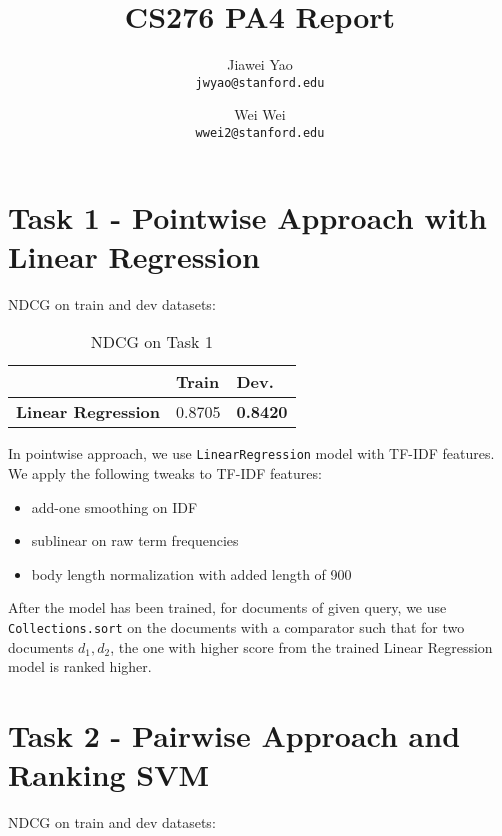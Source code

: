 \documentclass{article}
\begin{document}
\title{CS276 PA4 Report}

\author{
  Jiawei Yao\\
  \texttt{jwyao@stanford.edu}
  \and
  Wei Wei\\
  \texttt{wwei2@stanford.edu}
}

\maketitle

\section{Task 1 - Pointwise Approach with Linear Regression}

NDCG on train and dev datasets:

\begin{table}[!htb]
    \centering
    \begin{tabular}{| r | l | l |}
        \hline
        & \textbf{Train} & \textbf {Dev.} \\
        \hline
        \textbf{Linear Regression} & 0.8705 & \textbf{0.8420} \\
        \hline
    \end{tabular}
    \caption{NDCG on Task 1}
\end{table}

In pointwise approach, we use \texttt{LinearRegression} model with TF-IDF features.
We apply the following tweaks to TF-IDF features:

\begin{itemize}
    \item add-one smoothing on IDF
    \item sublinear on raw term frequencies
    \item body length normalization with added length of 900
\end{itemize}

After the model has been trained, for documents of given query, we use \texttt{Collections.sort} on the documents with a comparator such that
for two documents $d_1,d_2$, the one with higher score from the trained Linear Regression model is ranked higher.

\section{Task 2 - Pairwise Approach and Ranking SVM}

NDCG on train and dev datasets:
\end{document}
